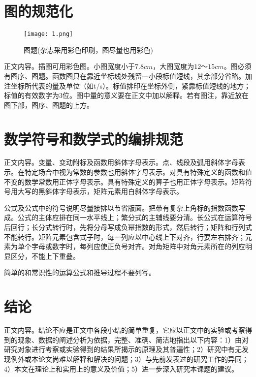 \documentclass{WHUReport}
\begin{document}
\begin{multicols}{2}
	\section{图的规范化}
	\begin{figure}[H]
		\centering
		\texttt{[image: 1.png]}
		\caption{图题(杂志采用彩色印刷，图尽量也用彩色)}	
		\label{example}
	\end{figure}
	
	正文内容。插图可用彩色图。小图宽度小于$7.8cm$，大图宽度为$12～15cm $。图必须有图序、图题。函数图只在靠近坐标线处残留一小段标值短线，其余部分省略。加注坐标所代表的量及单位（如t/s）。标值排印在坐标外侧，紧靠标值短线的地方；标值的有效数字为3位。图中量的意义要在正文中加以解释。若有图注，靠近放在图下部，图序、图题的上方。
	\section{数学符号和数学式的编排规范}
	正文内容。变量、变动附标及函数用斜体字母表示。点、线段及弧用斜体字母表示。在特定场合中视为常数的参数也用斜体字母表示。对具有特殊定义的函数和值不变的数学常数用正体字母表示\cite{4}。具有特殊定义的算子也用正体字母表示。矩阵符号用大写的黑斜体字母表示，矩阵元素用白斜体字母表示。
	
	公式及公式中的符号说明尽量接排以节省版面。把带有复杂上角标的指数函数写成。公式的主体应排在同一水平线上；繁分式的主辅线要分清。长公式在运算符号后回行；长分式转行时，先将分母写成负幂指数的形式，然后转行；矩阵和行列式不能转行。矩阵元素包含式子时，每一列应以中心线上下对齐，行要左右排齐；元素为单个字母或数字时，每列应使正负号对齐。对角矩阵中对角元素所在的列应明显区分，不能上下重叠\cite{5}。
	
	简单的和常识性的运算公式和推导过程不要列写。
	\section{结论}
	正文内容。结论不应是正文中各段小结的简单重复，它应以正文中的实验或考察得到的现象、数据的阐述分析为依据，完整、准确、简洁地指出以下内容：1）由对研究对象进行考察或实验得到的结果所揭示的原理及其普遍性；2）研究中有无发现例外或本论文尚难以解释和解决的问题；3）与先前发表过的研究工作的异同；4）本文在理论上和实用上的意义及价值；5）进一步深入研究本课题的建议。
	\small
        
	
\end{multicols}
\end{document}
